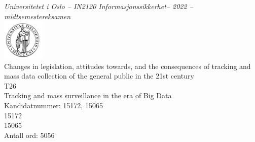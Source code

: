 \documentclass[11pt]{article}
\newcommand{\tittel}{Changes in legislation, attitudes towards, and the consequences of tracking and mass data collection of the general public in the 21st century}
\newcommand{\temanr}{T26} %
\newcommand{\tematittel}{Tracking and mass surveillance in the era of Big Data} %
\newcommand{\kandidatnr}{15172, 15065} %
\newcommand{\kandidatnrforside}{15172 \\ 15065}  %
\newcommand{\antallord}{5056} %
{\hspace{-1mm}}
\begin{document}
 \thispagestyle{empty}
\begin{center}
\normalsize{\textit{Universitetet i Oslo -- IN2120 Informasjonssikkerhet-- 2022 -- midtsemestereksamen}} \\
\vspace{1cm}
\includegraphics[width=0.15\textwidth]{uio_logo.png} \\
\vspace{1cm}
\huge{\tittel} \\
\Large{\temanr} \\
\Large{\tematittel} \\
\vspace{1cm}
\Large{Kandidatnummer: \kandidatnr} \\
\large{\kandidatnrforside} \\
\vspace{1cm}
\Large{Antall ord: \antallord} \\
\end{center}
\tableofcontents
\newpage

\end{document}
